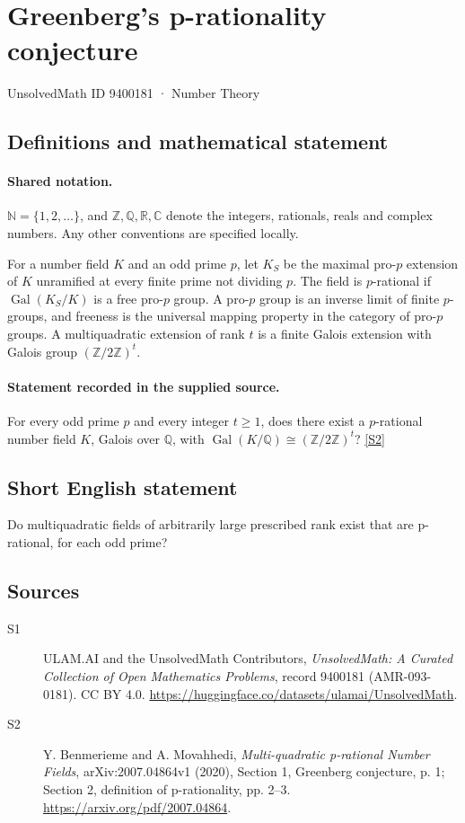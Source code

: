 \documentclass[11pt]{article}
\newcommand{\sref}[2]{\hyperlink{source:#1:#2}{[S#2]}}
\begin{document}
\setcounter{section}{9400180}
\section{Greenberg's p-rationality conjecture}\label{9400181}
{\small\sffamily UnsolvedMath ID 9400181 · Number Theory}
\subsection{Definitions and mathematical statement}

\paragraph{Shared notation.}$\mathbb N=\{1,2,\ldots\}$, and $\mathbb Z,\mathbb Q,\mathbb R,\mathbb C$ denote the integers, rationals, reals and complex numbers. Any other conventions are specified locally.


For a number field $K$ and an odd prime $p$, let $K_S$ be the maximal pro-$p$ extension of $K$ unramified at every finite prime not dividing $p$. The field is $p$-rational if $\operatorname{Gal}(K_S/K)$ is a free pro-$p$ group. A pro-$p$ group is an inverse limit of finite $p$-groups, and freeness is the universal mapping property in the category of pro-$p$ groups. A multiquadratic extension of rank $t$ is a finite Galois extension with Galois group $(\mathbb Z/2\mathbb Z)^t$.
\paragraph{Statement recorded in the supplied source.}
For every odd prime $p$ and every integer $t\ge1$, does there exist a $p$-rational number field $K$, Galois over $\mathbb Q$, with $\operatorname{Gal}(K/\mathbb Q)\cong(\mathbb Z/2\mathbb Z)^t$? \sref{9400181}{2}
\subsection{Short English statement}
Do multiquadratic fields of arbitrarily large prescribed rank exist that are p-rational, for each odd prime?
\subsection{Sources}
\begin{description}
\item[\hypertarget{source:9400181:1}{S1}] ULAM.AI and the UnsolvedMath Contributors, \emph{UnsolvedMath: A Curated Collection of Open Mathematics Problems}, record 9400181 (AMR-093-0181). CC BY 4.0. \url{https://huggingface.co/datasets/ulamai/UnsolvedMath}.
\item[\hypertarget{source:9400181:2}{S2}] Y. Benmerieme and A. Movahhedi, \emph{Multi-quadratic p-rational Number Fields}, arXiv:2007.04864v1 (2020), Section 1, Greenberg conjecture, p. 1; Section 2, definition of p-rationality, pp. 2--3. \url{https://arxiv.org/pdf/2007.04864}.
\end{description}
\label{end:9400181}
\end{document}

